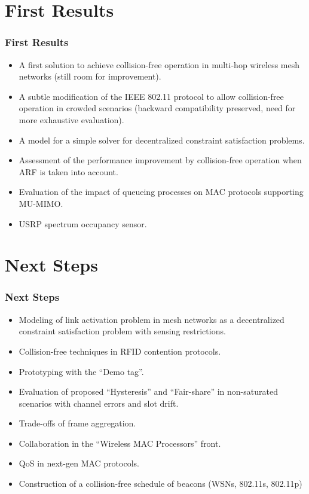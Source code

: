\documentclass{beamer}
\begin{document}
\section{First Results}
\begin{frame}
  \frametitle{First Results}
      \begin{block}{}
        \begin{itemize}
          \item A first solution to achieve collision-free operation in multi-hop wireless mesh networks (still room for improvement).
          \item A subtle modification of the IEEE 802.11 protocol to allow collision-free operation in crowded scenarios (backward compatibility preserved, need for more exhaustive evaluation).
          \item A model for a simple solver for decentralized constraint satisfaction problems.
          \item Assessment of the performance improvement by collision-free operation when ARF is taken into account.
          \item Evaluation of the impact of queueing processes on MAC protocols supporting MU-MIMO.
          \item USRP spectrum occupancy sensor.
        \end{itemize}
      \end{block}
\end{frame}


\section{Next Steps}
\begin{frame}
  \frametitle{Next Steps}
      \begin{block}{}
        \begin{itemize}
          \item Modeling of link activation problem in mesh networks as a decentralized constraint satisfaction problem with sensing restrictions.
          \item Collision-free techniques in RFID contention protocols.
          \item Prototyping with the ``Demo tag''.
          \item Evaluation of proposed ``Hysteresis'' and ``Fair-share'' in non-saturated scenarios with channel errors and slot drift.
          \item Trade-offs of frame aggregation.
          \item Collaboration in the ``Wireless MAC Processors'' front.
          \item QoS in next-gen MAC protocols.
          \item Construction of a collision-free schedule of beacons (WSNs, 802.11s, 802.11p)
        \end{itemize}
      \end{block}
\end{frame}
\end{document}

